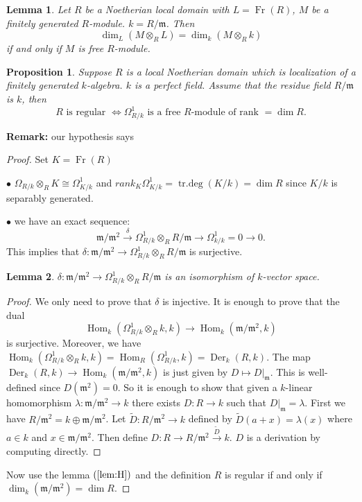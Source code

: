 \documentclass[cs4size]{article}
\newcommand{\rk}{rank}
\newcommand{\frm}{\mathfrak{m}}
\newcommand{\ra}{\rightarrow}
\newcommand{\xr}{\xrightarrow}
\DeclareMathOperator{\Der}{Der}
\DeclareMathOperator{\Hom}{Hom}
\DeclareMathOperator{\Fr}{Fr}
\DeclareMathOperator{\trdeg}{tr.deg}
\newtheorem{lem}{Lemma}
\newtheorem{prop}{Proposition}
\begin{document}
\begin{lem}\label{lem:H}
Let $R$ be a Noetherian local domain with $L=\Fr(R)$, $M$ be a finitely generated $R$-module. $k=R/\frm$. Then
\[\dim_L(M\otimes_RL)=\dim_k(M\otimes_Rk)\]
if and only if $M$ is free $R$-module.
\end{lem}


\begin{prop}
Suppose $R$ is a local Noetherian domain which is localization of a finitely generated $k$-algebra. $k$ is a perfect field. Assume that the residue field $R/\frm$ is $k$, then
\[R\text{ is regular }\Leftrightarrow \Omega_{R/k}^1 \text{ is a free $R$-module of rank }=\dim R.\]
\end{prop}
\textbf{Remark: }our hypothesis says
\begin{proof}
Set $K=\Fr(R)$

$\bullet$ $\Omega_{R/k}\otimes_RK\cong \Omega_{K/k}^1$ and $\rk_K\Omega_{K/k}^1=\trdeg(K/k)=\dim R$ since $K/k$ is separably generated.

$\bullet$ we have an exact sequence:
\[\frm/\frm^2\xr{\delta}\Omega_{R/k}^1\otimes_RR/\frm\ra \Omega_{k/k}^1=0\ra0.\]
This implies that $\delta: \frm/\frm^2\ra \Omega_{R/k}^1\otimes_RR/\frm$ is surjective.
\begin{lem}
$\delta: \frm/\frm^2\ra \Omega_{R/k}^1\otimes_RR/\frm$ is an isomorphism of $k$-vector space.
\end{lem}
\begin{proof}
We only need to prove that $\delta$ is injective. It is enough to prove that the dual
\[\Hom_k(\Omega_{R/k}^1\otimes_Rk,k)\ra\Hom_k(\frm/\frm^2,k)\]
is surjective. Moreover, we have $\Hom_k(\Omega_{R/k}^1\otimes_Rk,k)=\Hom_R(\Omega_{R/k}^1,k)=\Der_k(R,k)$. The map $\Der_k(R,k)\ra \Hom_k(\frm/\frm^2,k)$ is just given by $D\mapsto D|_\frm$. This is well-defined since $D(\frm^2)=0$. So it is enough to show that given a $k$-linear homomorphism $\lambda: \frm/\frm^2\ra k$ there exists $D: R\ra k$ such that $D|_\frm=\lambda$. First we have $R/\frm^2=k\oplus \frm/\frm^2$. Let $\tilde{D}: R/\frm^2\ra k$ defined by $\tilde{D}(a+x)=\lambda(x)$ where $a\in k$ and $x\in \frm/\frm^2$. Then define $D: R\ra R/\frm^2\xr{\tilde{D}}k$. $D$ is a derivation by computing directly.
\end{proof}
Now use the lemma $(\ref{lem:H})$ and the definition $R$ is regular if and only if $\dim_k(\frm/\frm^2)=\dim R$.
\end{proof}
\end{document}
